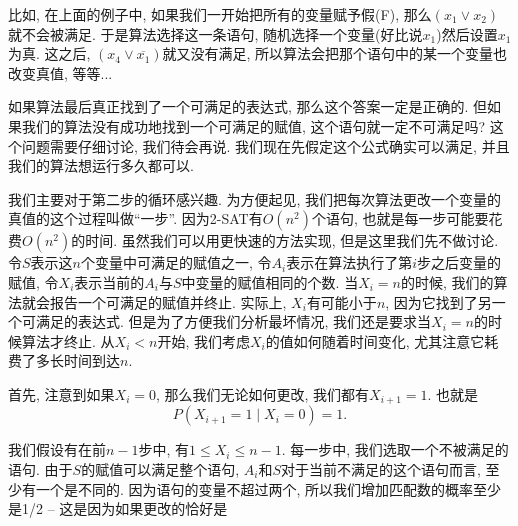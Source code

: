 比如, 在上面的例子中, 如果我们一开始把所有的变量赋予假(F), 那么$\left(x_1 \vee x_2\right)$就不会被满足. 于是算法选择这一条语句, 随机选择一个变量(好比说$x_1$)然后设置$x_1$为真. 这之后, $\left(x_4 \vee \overline{x_1}\right)$就又没有满足, 所以算法会把那个语句中的某一个变量也改变真值, 等等... 

如果算法最后真正找到了一个可满足的表达式, 那么这个答案一定是正确的. 但如果我们的算法没有成功地找到一个可满足的赋值, 这个语句就一定不可满足吗? 这个问题需要仔细讨论, 我们待会再说. 我们现在先假定这个公式确实可以满足, 并且我们的算法想运行多久都可以. 

我们主要对于第二步的循环感兴趣. 为方便起见, 我们把每次算法更改一个变量的真值的这个过程叫做``一步''. 因为2-SAT有$O(n^2)$个语句, 也就是每一步可能要花费$O(n^2)$的时间. 虽然我们可以用更快速的方法实现, 但是这里我们先不做讨论. 令$S$表示这$n$个变量中可满足的赋值之一, 令$A_i$表示在算法执行了第$i$步之后变量的赋值, 令$X_i$表示当前的$A_i$与$S$中变量的赋值相同的个数. 当$X_i=n$的时候, 我们的算法就会报告一个可满足的赋值并终止. 实际上, $X_i$有可能小于$n$, 因为它找到了另一个可满足的表达式. 但是为了方便我们分析最坏情况, 我们还是要求当$X_i=n$的时候算法才终止. 从$X_i<n$开始, 我们考虑$X_i$的值如何随着时间变化, 尤其注意它耗费了多长时间到达$n$. 

首先, 注意到如果$X_i=0$, 那么我们无论如何更改, 我们都有$X_{i+1}=1$. 也就是 $$P\left(X_{i+1}=1 \mid X_i=0\right)=1.$$

我们假设有在前$n-1$步中, 有$1 \leq X_i \leq n-1$. 每一步中, 我们选取一个不被满足的语句. 由于$S$的赋值可以满足整个语句, $A_i$和$S$对于当前不满足的这个语句而言, 至少有一个是不同的. 因为语句的变量不超过两个, 所以我们增加匹配数的概率至少是1/2 -- 这是因为如果更改的恰好是